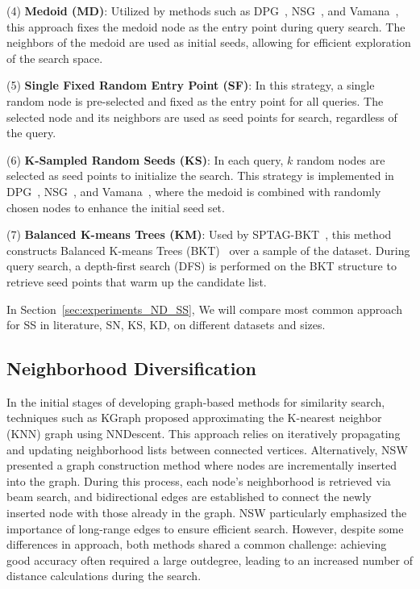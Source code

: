 \noindent (4) \textbf{Medoid (MD)}: Utilized by methods such as DPG~\cite{dpg}, NSG~\cite{nsg}, and Vamana~\cite{vamana}, this approach fixes the medoid node as the entry point during query search. The neighbors of the medoid are used as initial seeds, allowing for efficient exploration of the search space.

\noindent (5) \textbf{Single Fixed Random Entry Point (SF)}: In this strategy, a single random node is pre-selected and fixed as the entry point for all queries. The selected node and its neighbors are used as seed points for search, regardless of the query.

\noindent (6) \textbf{K-Sampled Random Seeds (KS)}: In each query, \(k\) random nodes are selected as seed points to initialize the search. This strategy is implemented in DPG~\cite{dpg}, NSG~\cite{nsg}, and Vamana~\cite{vamana}, where the medoid is combined with randomly chosen nodes to enhance the initial seed set.

\noindent (7) \textbf{Balanced K-means Trees (KM)}: Used by SPTAG-BKT~\cite{SPTAG2}, this method constructs Balanced K-means Trees (BKT)~\cite{bkmtree} over a sample of the dataset. During query search, a depth-first search (DFS) is performed on the BKT structure to retrieve seed points that warm up the candidate list.

In Section~\ref{sec:experiments_ND_SS}, We will compare most common approach for SS in literature, SN, KS, KD, on different datasets and sizes.




\subsection{Neighborhood Diversification}
\label{sec:nd}
In the initial stages of developing graph-based methods for similarity search, techniques such as KGraph proposed approximating the K-nearest neighbor (KNN) graph using NNDescent. This approach relies on iteratively propagating and updating neighborhood lists between connected vertices. Alternatively, NSW presented a graph construction method where nodes are incrementally inserted into the graph. During this process, each node’s neighborhood is retrieved via beam search, and bidirectional edges are established to connect the newly inserted node with those already in the graph. NSW particularly emphasized the importance of long-range edges to ensure efficient search. However, despite some differences in approach, both methods shared a common challenge: achieving good accuracy often required a large outdegree, leading to an increased number of distance calculations during the search.

